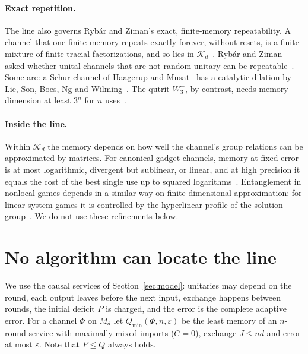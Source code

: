 \documentclass[11pt]{article}
\theoremstyle{definition}
\theoremstyle{remark}
\newcommand{\K}{\mathcal K}
\newcommand{\Wminus}{W_3^-}
\newcommand{\eps}{\varepsilon}
\begin{document}
\paragraph{Exact repetition.}
The line also governs Ryb\'ar and Ziman's exact, finite-memory repeatability. A channel that one finite memory repeats exactly forever, without resets, is a finite mixture of finite tracial factorizations, and so lies in $\K_d$~\cite[Proposition~4.6]{Law}. Ryb\'ar and Ziman asked whether unital channels that are not random-unitary can be repeatable~\cite[Section~IV]{RybarZiman}. Some are: a Schur channel of Haagerup and Musat~\cite[Example~3.3]{HM2011} has a catalytic dilation by Lie, Son, Boes, Ng and Wilming~\cite[Proposition~15]{LSBNW}. The qutrit $\Wminus$, by contrast, needs memory dimension at least $3^n$ for $n$ uses~\cite[Proposition~4.6]{Law}.

\paragraph{Inside the line.}
Within $\K_d$ the memory depends on how well the channel's group relations can be approximated by matrices. For canonical gadget channels, memory at fixed error is at most logarithmic, divergent but sublinear, or linear, and at high precision it equals the cost of the best single use up to squared logarithms~\cite[Theorems~5.1 and~6.5]{Law}. Entanglement in nonlocal games depends in a similar way on finite-dimensional approximation: for linear system games it is controlled by the hyperlinear profile of the solution group~\cite{SlofstraVidick}. We do not use these refinements below.


\section{No algorithm can locate the line}\label{sec:undecidable}

We use the causal services of Section~\ref{sec:model}: unitaries may depend on the round, each output leaves before the next input, exchange happens between rounds, the initial deficit $P$ is charged, and the error is the complete adaptive error. For a channel $\Phi$ on $M_d$ let $Q_{\min}(\Phi,n,\eps)$ be the least memory of an $n$-round service with maximally mixed imports ($C=0$), exchange $J\le nd$ and error at most $\eps$. Note that $P\le Q$ always holds.
\end{document}
